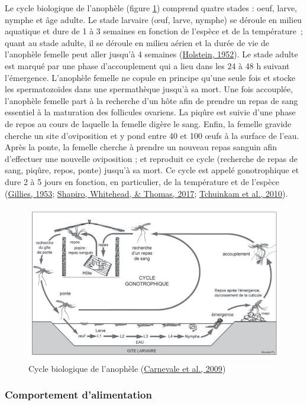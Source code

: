 \documentclass[12pt,twoside]{reedthesis}
\begin{document}
Le cycle biologique de l'anophèle (figure \ref{fig:cycle-biologique-anophele}) comprend quatre stades : oeuf, larve, nymphe et âge adulte. Le stade larvaire (œuf, larve, nymphe) se déroule en milieu aquatique et dure de 1 à 3 semaines en fonction de l'espèce et de la température~; quant au stade adulte, il se déroule en milieu aérien et la durée de vie de l'anophèle femelle peut aller jusqu'à 4 semaines (\protect\hyperlink{ref-holstein_biologie_1952}{Holstein, 1952}). Le stade adulte est marqué par une phase d'accouplement qui a lieu dans les 24 à 48 h suivant l'émergence. L'anophèle femelle ne copule en principe qu'une seule fois et stocke les spermatozoïdes dans une spermathèque jusqu'à sa mort. Une fois accouplée, l'anophèle femelle part à la recherche d'un hôte afin de prendre un repas de sang essentiel à la maturation des follicules ovariens. La piqûre est suivie d'une phase de repos au cours de laquelle la femelle digère le sang. Enfin, la femelle gravide cherche un site d'oviposition et y pond entre 40 et 100 œufs à la surface de l'eau. Après la ponte, la femelle cherche à prendre un nouveau repas sanguin afin d'effectuer une nouvelle oviposition ; et reproduit ce cycle (recherche de repas de sang, piqûre, repos, ponte) jusqu'à sa mort. Ce cycle est appelé gonotrophique et dure 2 à 5 jours en fonction, en particulier, de la température et de l'espèce (\protect\hyperlink{ref-gillies_duration_1953}{Gillies, 1953}; \protect\hyperlink{ref-shapiro_quantifying_2017}{Shapiro, Whitehead, \& Thomas, 2017}; \protect\hyperlink{ref-tchuinkam_bionomics_2010}{Tchuinkam et al., 2010}).\\
\begin{figure}

{\centering \includegraphics[width=1\linewidth]{figure/carnevale} 

}

\caption[Cycle biologique de l'anophèle]{Cycle biologique de l'anophèle (\protect\hyperlink{ref-carnevale_les_2009}{Carnevale et al., 2009})}\label{fig:cycle-biologique-anophele}
\end{figure}
\hypertarget{comportement-dalimentation}{%
\subsubsection{Comportement d'alimentation}\label{comportement-dalimentation}}
\end{document}
